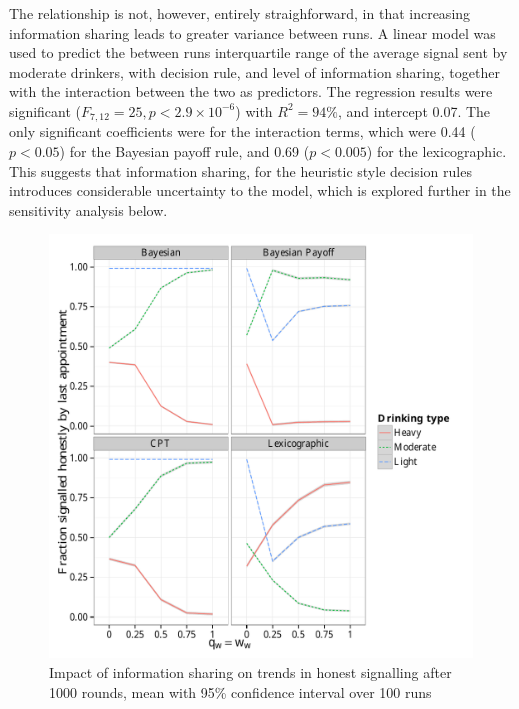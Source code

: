 The relationship is not, however, entirely straighforward, in that increasing information sharing leads to greater variance between runs. A linear model was used to predict the between runs interquartile range of the average signal sent by moderate drinkers, with decision rule, and level of information sharing, together with the interaction between the two as predictors. The regression results were significant (\(F_{7,12}=25,p<2.9\times10^{-6}\)) with \(R^2=94\%\), and intercept 0.07. The only significant coefficients were for the interaction terms, which were 0.44 (\(p<0.05\)) for the Bayesian payoff rule, and 0.69 (\(p<0.005\)) for the lexicographic. This suggests that information sharing, for the heuristic style decision rules introduces considerable uncertainty to the model, which is explored further in the sensitivity analysis below.

\begin{figure}[H]
\begin{adjustbox}{center}
\includegraphics[width=119mm]{figures/honesty_sharing}
\end{adjustbox}
\caption{Impact of information sharing on trends in honest signalling after 1000 rounds, mean with 95\% confidence interval over 100 runs}
\label{fig:honest_sharing}
\end{figure}

